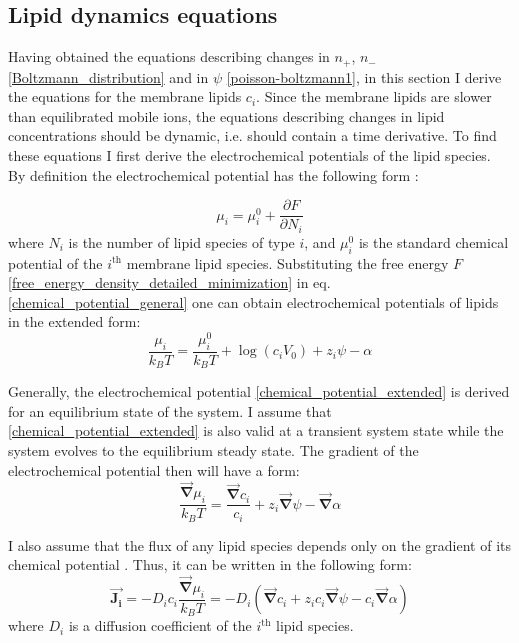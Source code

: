 \subsection{Lipid dynamics equations}

Having obtained the equations describing changes in $n_+$, $n_-$ \eqref{Boltzmann_distribution} and in $\psi$ \eqref{poisson-boltzmann1}, in this section I derive the equations for the membrane lipids $c_i$. Since the membrane lipids are slower than equilibrated mobile ions, the equations describing changes in lipid concentrations should be dynamic, i.e. should contain a time derivative. To find these equations I first derive the electrochemical potentials of the lipid species. By definition the electrochemical potential has the following form \cite{Huang1963}:

\begin{equation}
 \label{chemical_potential_general}\mu_i=\mu_i^0+\frac{\partial F}{\partial N_i}
\end{equation}
where $N_i$ is the number of lipid species of type $i$, and $\mu_i^0$ is the standard chemical potential of the $i^\text{th}$ membrane lipid species. Substituting the free energy $F$ \eqref{free_energy_density_detailed_minimization} in eq. \eqref{chemical_potential_general} one can obtain electrochemical potentials of lipids in the extended form:
\begin{equation}
\label{chemical_potential_extended}\frac{\mu_i}{k_BT}= \frac{\mu_i^0}{k_BT} + \log (c_i V_0) + z_i\psi - \alpha
\end{equation}

Generally, the electrochemical potential \eqref{chemical_potential_extended} is derived for an equilibrium state of the system. I assume that \eqref{chemical_potential_extended} is also valid at a transient system state while the system evolves to the equilibrium steady state. The gradient of the electrochemical potential then will have a form:
\begin{equation}
\label{gradient_mu} \frac{\vec{\mathbf{\nabla}}\mu_i}{k_BT} = \frac{\vec{\mathbf{\nabla}} c_i}{c_i} + z_i\vec{\mathbf{\nabla}}\psi - \vec{\mathbf{\nabla}} \alpha
\end{equation}

I also assume that the flux of any lipid species depends only on the gradient of its chemical potential \cite{Groot1984}. Thus, it can be written in the following form:
\begin{equation}
\label{flux_lipid}\vec{\mathbf{J_i}}=-D_ic_i\frac{\vec{\mathbf{\nabla}}\mu_i}{k_BT}=-D_i(\vec{\mathbf{\nabla}} c_i + z_i c_i \vec{\mathbf{\nabla}}\psi - c_i\vec{\mathbf{\nabla}} \alpha)
\end{equation}
where $D_i$ is a diffusion coefficient of the $i^\text{th}$ lipid species.

